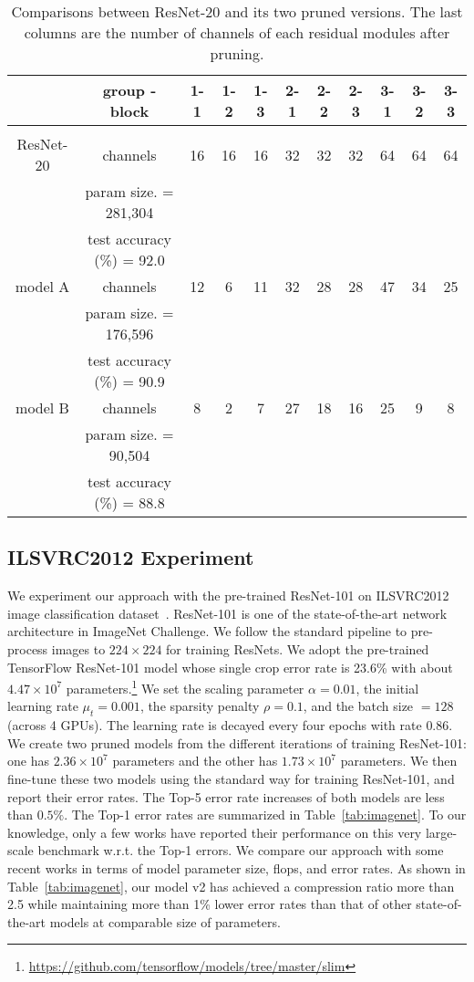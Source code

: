 \documentclass{article} %
\begin{document}
\begin{table}[htp]\centering
\begin{tabular}{c|c|ccccccccc}
& group - block & 1-1 & 1-2 & 1-3 & 2-1 & 2-2 & 2-3 & 3-1 & 3-2 & 3-3 \\\hline &&\\
ResNet-20 & channels & 16 & 16 & 16 & 32 & 32 & 32 & 64 & 64 & 64 \\
& param size. = 281,304 & \\
& test accuracy (\%) = 92.0& \\\hline
model A & channels & 12 & 6 & 11 & 32 & 28 & 28 & 47 & 34 & 25 \\
& param size. = 176,596 & \\
& test accuracy (\%) = 90.9 & \\\hline 
model B & channels & 8 & 2 & 7 & 27 & 18 & 16 & 25 & 9 & 8 \\
& param size. = 90,504 & \\
& test accuracy (\%) = 88.8 & 
\end{tabular}
\caption{Comparisons between ResNet-20 and its two pruned versions. The last columns are the number of
channels of each residual modules after pruning.}\label{tab:resnet20}
\end{table}


\subsection{ILSVRC2012 Experiment}
We experiment our approach with the pre-trained ResNet-101 on ILSVRC2012 image classification dataset~\citep{he2016deep}. ResNet-101 is one of the state-of-the-art network architecture in ImageNet Challenge. 
We follow the standard pipeline to pre-process images to $224 \times 224$ for training ResNets. We adopt
the pre-trained TensorFlow ResNet-101 model whose single crop error rate is 23.6\% with about $4.47 \times 10^7$ parameters.\footnote{\url{https://github.com/tensorflow/models/tree/master/slim}}
We set the scaling parameter $\alpha=0.01$, the initial learning rate $\mu_t=0.001$, the sparsity penalty $\rho =0.1$, and the batch size $=128$ (across 4 GPUs). The learning rate is decayed every four epochs with rate $0.86$. We create two pruned models from the different iterations of training ResNet-101: 
one has $2.36 \times 10^7$ parameters and the other has $1.73 \times 10^7$ parameters. We then fine-tune 
these two models using the standard way for training ResNet-101, and report their error rates.
The Top-5 error rate increases of both models are less than $0.5\%$. 
The Top-1 error rates are summarized in Table~\ref{tab:imagenet}. To our knowledge,
only a few works have reported their performance on this very large-scale benchmark w.r.t. the Top-1 errors. We compare
our approach with some recent works in terms of model parameter size, flops, and error rates. 
As shown in Table~\ref{tab:imagenet},
our model v2 has achieved a compression ratio more than 2.5 while  maintaining
more than 1\% lower error rates than that of other state-of-the-art 
models at comparable size of parameters. 
\end{document}
